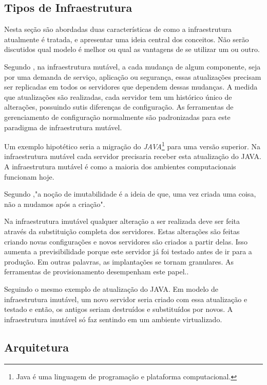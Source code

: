  \subsection{Tipos de Infraestrutura}
 
Nesta seção são abordadas duas características de como a infraestrutura atualmente é tratada, e apresentar uma ideia central dos conceitos. Não serão discutidos qual modelo é melhor ou qual as vantagens de se utilizar um ou outro.

Segundo , na infraestrutura mutável, a cada mudança de algum componente, seja por uma demanda de serviço, aplicação ou segurança, essas atualizações precisam ser replicadas em todos os servidores que dependem dessas mudanças. A medida que atualizações são realizadas, cada servidor tem um histórico único de alterações, possuindo sutis diferenças de configuração. As ferramentas de gerenciamento de configuração normalmente são padronizadas para este paradigma de infraestrutura mutável.

Um exemplo hipotético seria a migração do \textit{JAVA}\footnote{Java é uma linguagem de programação e plataforma computacional.} para uma versão superior. Na infraestrutura mutável cada servidor precisaria receber esta atualização do JAVA. A infraestrutura mutável é como a maioria dos ambientes computacionais funcionam hoje.
 
 Segundo ,"a noção de imutabilidade é a ideia de que, uma vez criada uma coisa, não a mudamos após a criação".
 
 \hfill
 
 Na infraestrutura imutável qualquer alteração a ser realizada deve ser feita através da substituição completa dos servidores. Estas alterações são feitas criando novas configurações e novos servidores são criados a partir delas. Isso aumenta a previsibilidade porque este servidor já foi testado antes de ir para a produção. Em outras palavras, as implantações se tornam granulares. As ferramentas de provisionamento desempenham este papel.\cite{Morris:2016:ICM:3006361}.
 
  Seguindo o mesmo exemplo de atualização do JAVA. Em modelo de infraestrutura imutável, um novo servidor seria criado com essa atualização e testado e então, os antigos seriam destruídos e substituídos por novos. A infraestrutura imutável só faz sentindo em um ambiente virtualizado. 
 
\subsection{Arquitetura}


